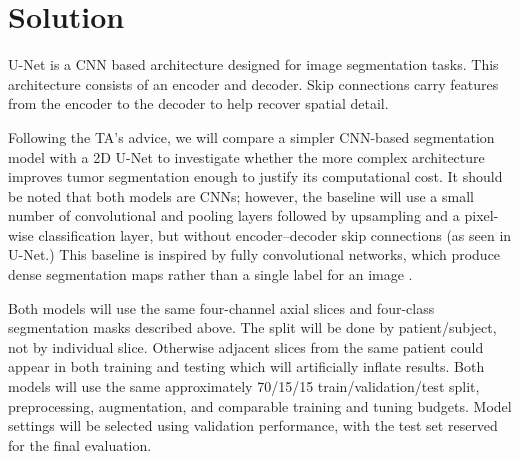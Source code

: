 
\section{Solution}

U-Net is a CNN based architecture designed for image segmentation tasks. This architecture consists of an encoder and decoder. Skip connections carry features from the encoder to the decoder to help recover spatial detail. \cite{unet}

Following the TA's advice, we will compare a simpler CNN-based segmentation model with a 2D U-Net to investigate whether the more complex architecture improves tumor segmentation enough to justify its computational cost. It should be noted that both models are CNNs; however, the baseline will use a small number of convolutional and pooling layers followed by upsampling and a pixel-wise classification layer, but without encoder--decoder skip connections (as seen in U-Net.) This baseline is inspired by fully convolutional networks, which produce dense segmentation maps rather than a single label for an image \cite{fcn}.

Both models will use the same four-channel axial slices and four-class segmentation masks described above.
The split will be done by patient/subject, not by individual slice. Otherwise adjacent slices from the same patient could appear in both training and testing which will artificially inflate results. Both models will use the same approximately 70/15/15 train/validation/test split, preprocessing, augmentation, and comparable training and tuning budgets. Model settings will be selected using validation performance, with the test set reserved for the final evaluation.

